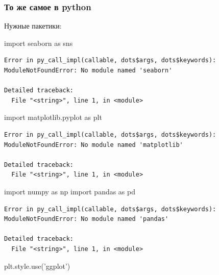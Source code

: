 \documentclass[]{book}
\newenvironment{Shaded}{\begin{snugshade}}{\end{snugshade}}
\newcommand{\ImportTok}[1]{#1}
\newcommand{\NormalTok}[1]{#1}
\newcommand{\StringTok}[1]{\textcolor[rgb]{0.31,0.60,0.02}{#1}}
\begin{document}
\hypertarget{----python}{%
\subsubsection{То же самое в python}\label{----python}}

Нужные пакетики:

\begin{Shaded}
\begin{Highlighting}[]
\ImportTok{import}\NormalTok{ seaborn }\ImportTok{as}\NormalTok{ sns}
\end{Highlighting}
\end{Shaded}

\begin{verbatim}
Error in py_call_impl(callable, dots$args, dots$keywords): ModuleNotFoundError: No module named 'seaborn'

Detailed traceback: 
  File "<string>", line 1, in <module>
\end{verbatim}

\begin{Shaded}
\begin{Highlighting}[]
\ImportTok{import}\NormalTok{ matplotlib.pyplot }\ImportTok{as}\NormalTok{ plt}
\end{Highlighting}
\end{Shaded}

\begin{verbatim}
Error in py_call_impl(callable, dots$args, dots$keywords): ModuleNotFoundError: No module named 'matplotlib'

Detailed traceback: 
  File "<string>", line 1, in <module>
\end{verbatim}

\begin{Shaded}
\begin{Highlighting}[]
\ImportTok{import}\NormalTok{ numpy }\ImportTok{as}\NormalTok{ np}
\ImportTok{import}\NormalTok{ pandas }\ImportTok{as}\NormalTok{ pd}
\end{Highlighting}
\end{Shaded}

\begin{verbatim}
Error in py_call_impl(callable, dots$args, dots$keywords): ModuleNotFoundError: No module named 'pandas'

Detailed traceback: 
  File "<string>", line 1, in <module>
\end{verbatim}

\begin{Shaded}
\begin{Highlighting}[]
\NormalTok{plt.style.use(}\StringTok{'ggplot'}\NormalTok{)}
\end{Highlighting}
\end{Shaded}
\end{document}
